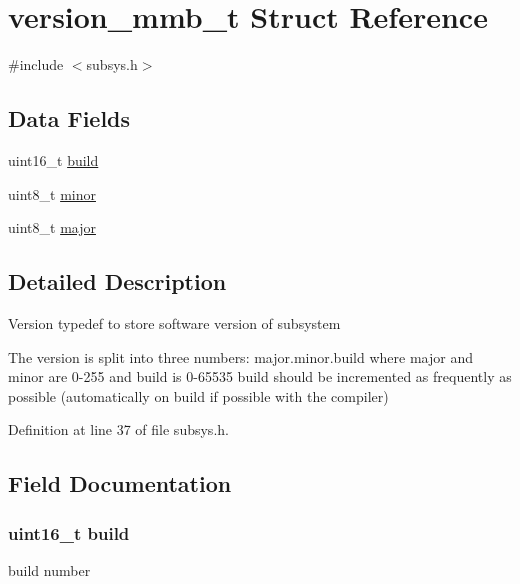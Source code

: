 \hypertarget{structversion__mmb__t}{}\section{version\+\_\+mmb\+\_\+t Struct Reference}
\label{structversion__mmb__t}


{\ttfamily \#include $<$subsys.\+h$>$}

\subsection*{Data Fields}
\begin{DoxyCompactItemize}
\item 
uint16\+\_\+t \hyperlink{structversion__mmb__t_aa5d23c27d72b550d324a95811f0d46a8}{build}
\item 
uint8\+\_\+t \hyperlink{structversion__mmb__t_ae2f416b0a34b7beb4ed3873d791ac393}{minor}
\item 
uint8\+\_\+t \hyperlink{structversion__mmb__t_a5bd4e4c943762926c8f653b6224cced2}{major}
\end{DoxyCompactItemize}


\subsection{Detailed Description}
Version typedef to store software version of subsystem

The version is split into three numbers\+: major.\+minor.\+build where major and minor are 0-\/255 and build is 0-\/65535 build should be incremented as frequently as possible (automatically on build if possible with the compiler) 

Definition at line 37 of file subsys.\+h.



\subsection{Field Documentation}
\hypertarget{structversion__mmb__t_aa5d23c27d72b550d324a95811f0d46a8}{}
\subsubsection[{build}]{\setlength{\rightskip}{0pt plus 5cm}uint16\+\_\+t build}\label{structversion__mmb__t_aa5d23c27d72b550d324a95811f0d46a8}
build number 

